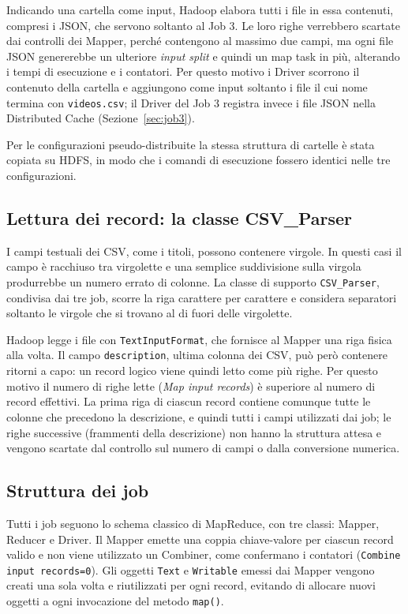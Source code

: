 \documentclass[12pt, a4paper]{article}
\begin{document}
Indicando una cartella come input, Hadoop elabora tutti
i file in essa contenuti, compresi i JSON, che servono
soltanto al Job 3. Le loro righe verrebbero scartate
dai controlli dei Mapper, perché contengono al massimo
due campi, ma ogni file JSON genererebbe un ulteriore
\textit{input split} e quindi un map task in più,
alterando i tempi di esecuzione e i contatori.
Per questo motivo i Driver scorrono il contenuto
della cartella e aggiungono come input soltanto
i file il cui nome termina con \texttt{videos.csv};
il Driver del Job 3 registra invece i file JSON
nella Distributed Cache (Sezione~\ref{sec:job3}).

Per le configurazioni pseudo-distribuite la stessa
struttura di cartelle è stata copiata su HDFS,
in modo che i comandi di esecuzione fossero identici
nelle tre configurazioni.

\subsection{Lettura dei record: la classe CSV\_Parser}
\label{sec:parser}

I campi testuali dei CSV, come i titoli, possono contenere
virgole. In questi casi il campo è racchiuso tra virgolette
e una semplice suddivisione sulla virgola produrrebbe
un numero errato di colonne.
La classe di supporto \texttt{CSV\_Parser}, condivisa
dai tre job, scorre la riga carattere per carattere
e considera separatori soltanto le virgole che si trovano
al di fuori delle virgolette.

Hadoop legge i file con \texttt{TextInputFormat},
che fornisce al Mapper una riga fisica alla volta.
Il campo \texttt{description}, ultima colonna dei CSV,
può però contenere ritorni a capo: un record logico
viene quindi letto come più righe.
Per questo motivo il numero di righe lette
(\textit{Map input records}) è superiore al numero
di record effettivi.
La prima riga di ciascun record contiene comunque
tutte le colonne che precedono la descrizione,
e quindi tutti i campi utilizzati dai job;
le righe successive (frammenti della descrizione)
non hanno la struttura attesa e vengono scartate
dal controllo sul numero di campi o dalla
conversione numerica.

\subsection{Struttura dei job}

Tutti i job seguono lo schema classico di MapReduce,
con tre classi: Mapper, Reducer e Driver.
Il Mapper emette una coppia chiave-valore per ciascun
record valido e non viene utilizzato un Combiner,
come confermano i contatori (\texttt{Combine input records=0}).
Gli oggetti \texttt{Text} e \texttt{Writable} emessi dai Mapper
vengono creati una sola volta e riutilizzati per ogni record,
evitando di allocare nuovi oggetti a ogni invocazione
del metodo \texttt{map()}.
\end{document}
